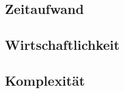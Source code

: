 \lipsum[5]

\subsection{Zeitaufwand}\label{subsec:zeitaufwand}
\lipsum[5]

\subsection{Wirtschaftlichkeit}\label{subsec:wirtschaftlichkeit}
\lipsum[5]

\subsection{Komplexität}\label{subsec:komplexitat}
\lipsum[5]
